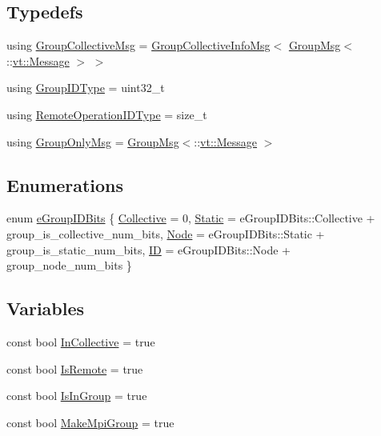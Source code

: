 \subsection*{Typedefs}
\begin{DoxyCompactItemize}
\item 
using \hyperlink{namespacevt_1_1group_a4c1183efe0185992fefb3ab38a55a8a7}{Group\+Collective\+Msg} = \hyperlink{structvt_1_1group_1_1_group_collective_info_msg}{Group\+Collective\+Info\+Msg}$<$ \hyperlink{structvt_1_1group_1_1_group_msg}{Group\+Msg}$<$\+::\hyperlink{namespacevt_a3a3ddfef40b4c90915fa43cdd5f129ea}{vt\+::\+Message} $>$ $>$
\item 
using \hyperlink{namespacevt_1_1group_a805a6643787ae841525c371fd0cefeb3}{Group\+I\+D\+Type} = uint32\+\_\+t
\item 
using \hyperlink{namespacevt_1_1group_a73f2624ddeb535b39a08b6524f26b244}{Remote\+Operation\+I\+D\+Type} = size\+\_\+t
\item 
using \hyperlink{namespacevt_1_1group_a864fcf6bc821eacf8350bf4ad15e51b3}{Group\+Only\+Msg} = \hyperlink{structvt_1_1group_1_1_group_msg}{Group\+Msg}$<$\+::\hyperlink{namespacevt_a3a3ddfef40b4c90915fa43cdd5f129ea}{vt\+::\+Message} $>$
\end{DoxyCompactItemize}
\subsection*{Enumerations}
\begin{DoxyCompactItemize}
\item 
enum \hyperlink{namespacevt_1_1group_a5a472f320821bf638e6df82757b71163}{e\+Group\+I\+D\+Bits} \{ \hyperlink{namespacevt_1_1group_a5a472f320821bf638e6df82757b71163a2481b27ee837a6fc7709550eef0a5602}{Collective} = 0, 
\hyperlink{namespacevt_1_1group_a5a472f320821bf638e6df82757b71163a67197d5832dbcbeb0d003fc3d92596ac}{Static} = e\+Group\+I\+D\+Bits\+:\+:Collective + group\+\_\+is\+\_\+collective\+\_\+num\+\_\+bits, 
\hyperlink{namespacevt_1_1group_a5a472f320821bf638e6df82757b71163a8a4c96811eeee2e4ecf9520f29210cd2}{Node} = e\+Group\+I\+D\+Bits\+:\+:Static + group\+\_\+is\+\_\+static\+\_\+num\+\_\+bits, 
\hyperlink{namespacevt_1_1group_a5a472f320821bf638e6df82757b71163a68ffa7e9fa8eaee4a810f08df0525f68}{ID} = e\+Group\+I\+D\+Bits\+:\+:Node + group\+\_\+node\+\_\+num\+\_\+bits
 \}
\end{DoxyCompactItemize}
\subsection*{Variables}
\begin{DoxyCompactItemize}
\item 
const bool \hyperlink{namespacevt_1_1group_a455f74f58580113355ddb629a74aee80}{In\+Collective} = true
\item 
const bool \hyperlink{namespacevt_1_1group_a1f3a371585b88778a3c36b369335e657}{Is\+Remote} = true
\item 
const bool \hyperlink{namespacevt_1_1group_a7e31bd0e87c50b4d8e016bf720adffb6}{Is\+In\+Group} = true
\item 
const bool \hyperlink{namespacevt_1_1group_afe5d421743ecbbd8ed3566641c06c288}{Make\+Mpi\+Group} = true
\end{DoxyCompactItemize}


